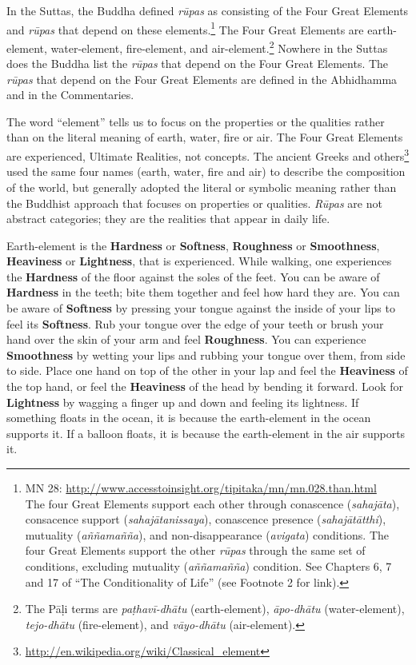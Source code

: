 In the Suttas, the Buddha defined \textit{rūpas} as consisting of the Four Great Elements and \textit{rūpas} that depend on these elements.\footnote{MN 28: \url{http://www.accesstoinsight.org/tipitaka/mn/mn.028.than.html}\\ The four Great Elements support each other through conascence (\textit{sahajāta}), consacence support (\textit{sahajātanissaya}), conascence presence (\textit{sahajātātthi}), mutuality (\textit{\textit{aññamañña}}), and non-disappearance (\textit{avigata}) conditions. The four Great Elements support the other \textit{rūpas} through the same set of conditions, excluding mutuality (\textit{\textit{aññamañña}}) condition. See Chapters 6, 7 and 17 of “The Conditionality of Life” (see Footnote 2 for link).} The Four Great Elements are earth-element, water-element, fire-element, and air-element.\footnote{The Pāḷi terms are \textit{paṭhavī-dhātu} (earth-element), \textit{āpo-dhātu} (water-element), \textit{tejo-dhātu} (fire-element), and \textit{vāyo-dhātu} (air-element).} Nowhere in the Suttas does the Buddha list the \textit{rūpas} that depend on the Four Great Elements. The \textit{rūpas} that depend on the Four Great Elements are defined in the Abhidhamma and in the Commentaries.

The word “element” tells us to focus on the properties or the qualities rather than on the literal meaning of earth, water, fire or air. The Four Great Elements are experienced, Ultimate Realities, not concepts. The ancient Greeks and others\footnote{\url{http://en.wikipedia.org/wiki/Classical_element}} used the same four names (earth, water, fire and air) to describe the composition of the world, but generally adopted the literal or symbolic meaning rather than the Buddhist approach that focuses on properties or qualities. \textit{Rūpas} are not abstract categories; they are the realities that appear in daily life.

\pagebreak

Earth-element is the \textbf{Hardness} or \textbf{Softness}, \textbf{Roughness} or \textbf{Smoothness}, \textbf{Heaviness} or \textbf{Lightness}, that is experienced. While walking, one experiences the \textbf{Hardness} of the floor against the soles of the feet. You can be aware of \textbf{Hardness} in the teeth; bite them together and feel how hard they are. You can be aware of \textbf{Softness} by pressing your tongue against the inside of your lips to feel its \textbf{Softness}. Rub your tongue over the edge of your teeth or brush your hand over the skin of your arm and feel \textbf{Roughness}. You can experience \textbf{Smoothness} by wetting your lips and rubbing your tongue over them, from side to side. Place one hand on top of the other in your lap and feel the \textbf{Heaviness} of the top hand, or feel the \textbf{Heaviness} of the head by bending it forward. Look for \textbf{Lightness} by wagging a finger up and down and feeling its lightness. If something floats in the ocean, it is because the earth-element in the ocean supports it. If a balloon floats, it is because the earth-element in the air supports it.

